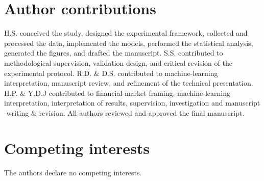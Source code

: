 \documentclass[fleqn,10pt]{wlscirep}
\begin{document}
\section*{Author contributions}
H.S. conceived the study, designed the experimental framework, collected and processed the data, implemented the models, performed the statistical analysis, generated the figures, and drafted the manuscript. S.S. contributed to methodological supervision, validation design, and critical revision of the experimental protocol. R.D. \& D.S. contributed to machine-learning interpretation, manuscript review, and refinement of the technical presentation. H.P. \& Y.D.J contributed to financial-market framing, machine-learning interpretation, interpretation of results, supervision, investigation and manuscript -writing \& revision. All authors reviewed and approved the final manuscript.

\section*{Competing interests}

The authors declare no competing interests.
\end{document}
